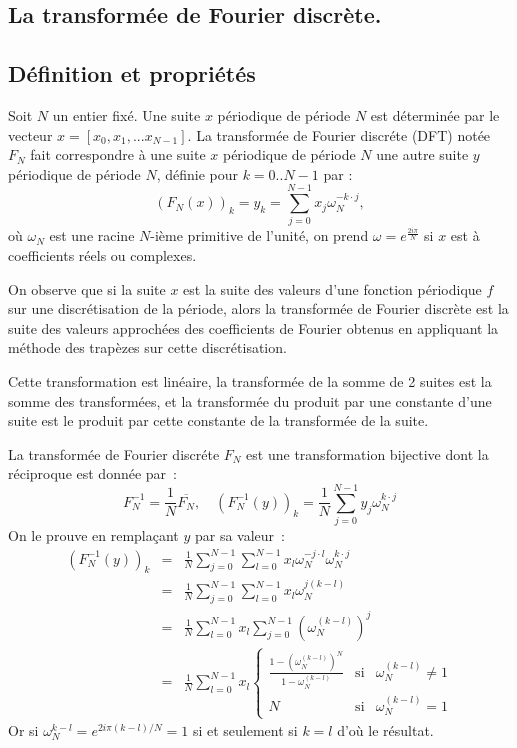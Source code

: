 \documentclass[a4paper,11pt]{book}
\begin{document}
\begin{giacjshere}
\chapter{La transform\'ee de Fourier discr\`ete.}
\label{sec:dft}
\section{D\'efinition et propri\'et\'es}
Soit $N$ un entier fixé. Une suite $x$ p\'eriodique de p\'eriode $N$ est
d\'etermin\'ee par le vecteur $x=[x_0,x_1,...x_{N-1}]$.
La transform\'ee de Fourier discr\'ete (DFT) notée $F_N$ fait correspondre 
à une suite $x$ p\'eriodique de p\'eriode $N$ une autre suite $y$
p\'eriodique de p\'eriode $N$, d\'efinie pour $k=0..N-1$ par :
\[ 
{(F_N(x))}_k=y_k=\sum_{j=0}^{N-1} x_j \omega_N^{-k\cdot j},
\]
où $\omega_N$ est une racine $N$-i\`eme primitive de l'unit\'e,
on prend $\omega=e^{\frac{2i\pi}{N}}$ si $x$ est à coefficients réels
ou complexes.

On observe que si la suite $x$ est la suite des valeurs d'une fonction
p\'eriodique $f$ sur une discr\'etisation de la p\'eriode, alors
la transform\'ee de Fourier discr\`ete est la suite des valeurs approch\'ees
des coefficients de Fourier obtenus en appliquant la m\'ethode des
trap\`ezes sur cette discr\'etisation.

Cette transformation est linéaire, la transformée de la somme de 2
suites est la somme des transformées, et la transformée du produit
par une constante d'une suite 
est le produit par cette constante de la transformée
de la suite.

La transform\'ee de Fourier discr\'ete  $F_N$ est une transformation 
bijective dont la réciproque est donnée par~:
\[ F_N^{-1}=\frac{1}{N} \overline{F_N}, \quad
{(F_N^{-1}(y))}_k=\frac{1}{N}\sum_{j=0}^{N-1}y_j\omega_N^{k\cdot j}
\]
On le prouve en remplaçant $y$ par sa valeur~:
\begin{eqnarray*}
{(F_N^{-1}(y))}_k &=&
\frac{1}{N}\sum_{j=0}^{N-1} \sum_{l=0}^{N-1} x_l \omega_N^{-j\cdot l}
\omega_N^{k\cdot j} \\
&=&
\frac{1}{N}\sum_{j=0}^{N-1} \sum_{l=0}^{N-1} x_l \omega_N^{j (k-l)} \\
&=& 
\frac{1}{N} \sum_{l=0}^{N-1} x_l \sum_{j=0}^{N-1} (\omega_N^{(k-l)})^j \\
&=&
\frac{1}{N} \sum_{l=0}^{N-1} x_l 
\left\{ \begin{array}{lcl}
\frac{1-(\omega_N^{(k-l)})^N}{1-\omega_N^{(k-l)}} & \mbox{si} &
\omega_N^{(k-l)}\neq 1 \\
N & \mbox{si} & \omega_N^{(k-l)} = 1 
\end{array} \right.
\end{eqnarray*}
Or si $\omega_N^{k-l}=e^{2i\pi(k-l)/N}=1$ si et seulement si $k=l$
d'où le résultat.


\end{giacjshere}
\end{document}
